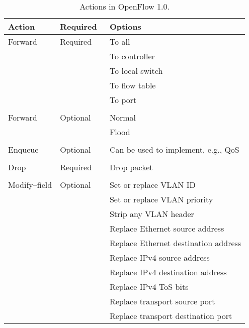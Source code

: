\begin{table}
  \centering
  \begin{tabular}{lll}
      \textbf{Action} &
      \textbf{Required} &
      \textbf{Options} \\

    \hline
      Forward &
      Required &
               To all \\
     & & To controller \\
     & & To local switch \\
     & & To flow table \\
     & & To port \\
    \\
      Forward &
      Optional &
               Normal \\
     & & Flood \\
    \\
      Enqueue &
      Optional &
      Can be used to implement, e.g., \acs{QoS} \\
    \\
      Drop &
      Required &
      Drop packet \\
    \\
      Modify--field &
      Optional &
               Set or replace VLAN ID \\
     & & Set or replace VLAN priority \\
     & & Strip any VLAN header \\
     & & Replace Ethernet source address \\
     & & Replace Ethernet destination address \\
     & & Replace IPv4 source address \\
     & & Replace IPv4 destination address \\
     & & Replace IPv4 \acs{ToS} bits \\
     & & Replace transport source port \\
     & & Replace transport destination port \\
  \end{tabular}
  \caption{Actions in OpenFlow 1.0.}
  \label{table:openflow-1.0.actions}
\end{table}

